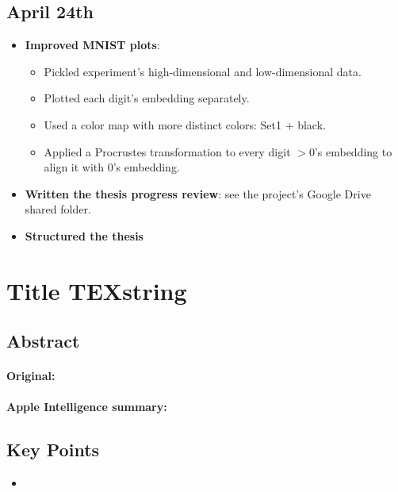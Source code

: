 \documentclass[a4paper,12pt]{article}
\begin{document}
\subsection{April 24th}
\begin{itemize}
    \item \textbf{Improved MNIST plots}:
    
    \begin{itemize}
        \item Pickled experiment's high-dimensional and low-dimensional data.
        \item Plotted each digit's embedding separately.
        \item Used a color map with more distinct colors: Set1 + black.
        \item Applied a Procrustes transformation to every digit $> 0$'s embedding to align it with 0's embedding.
    \end{itemize}

    \item \textbf{Written the thesis progress review}: see the project's Google Drive shared folder.
    
    \item \textbf{Structured the thesis}
    
    
\end{itemize}



\pagebreak
\section{Title \texorpdfstring{TEXstring}{TEXstring}}
\label{sec:}

\subsection{Abstract}

\paragraph{Original:}

\paragraph{Apple Intelligence summary:}


\subsection{Key Points}

\begin{itemize}
    \item 
\end{itemize}


\pagebreak
\printbibliography
\end{document}
